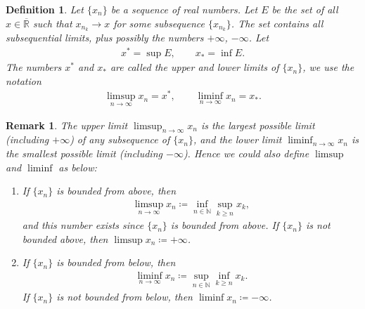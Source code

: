 \documentclass[10pt]{book}
\newtheorem{definition}{Definition}[chapter]
\newtheorem{remark}{Remark}[chapter]
\theoremstyle{definition}
\numberwithin{equation}{chapter}
\begin{document}
\begin{definition}\label{def_28}
Let $\{x_n\}$ be a sequence of real numbers. Let $E$ be the set of all $x \in \overline{\mathbb{R}}$ such that $x_{n_k} \to x$ for some subsequence $\{x_{n_k}\}$. The set contains all subsequential limits, plus possibly the numbers $+\infty$, $-\infty$. Let
\begin{align*}
    x^* = \sup E, \qquad x_* = \inf E.
\end{align*}
The numbers $x^*$ and $x_*$ are called the upper and lower limits of $\{x_n\}$, we use the notation
\begin{align*}
    \limsup_{n\to\infty} x_n = x^*, \qquad \liminf_{n\to\infty} x_n = x_*.
\end{align*}
\end{definition}

\begin{remark}
The upper limit $\limsup_{n\to\infty} x_n$ is the largest possible limit (including $+\infty$) of any subsequence of $\{x_n\}$, and the lower limit $\liminf_{n\to\infty} x_n$ is the smallest possible limit (including $-\infty$). Hence we could also define $\limsup$ and $\liminf$ as below:
\begin{enumerate}[label=(\alph*)]
    \item If $\{x_n\}$ is bounded from above, then \begin{align*}
        \limsup_{n\to\infty} x_n \coloneqq \inf_{n \in \mathbb{N}} \sup_{k \geq n} x_k,
    \end{align*}
    and this number exists since $\{x_n\}$ is bounded from above. If $\{x_n\}$ is not bounded above, then $\limsup x_n \coloneqq +\infty$.
    
    \item If $\{x_n\}$ is bounded from below, then \begin{align*}
        \liminf_{n\to\infty} x_n \coloneqq \sup_{n \in \mathbb{N}} \inf_{k \geq n} x_k.
    \end{align*}
    If $\{x_n\}$ is not bounded from below, then $\liminf x_n \coloneqq -\infty$.
\end{enumerate}
\end{remark}

\medskip
\end{document}
